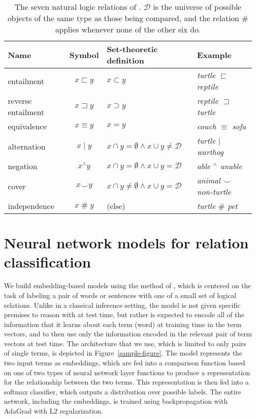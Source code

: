 \documentclass[letterpaper]{article}
\newcommand{\nateq}{\equiv}
\newcommand{\natind}{\mathbin{\#}}
\newcommand{\natneg}{\mathbin{^{\wedge}}}
\newcommand{\natfor}{\sqsubset}
\newcommand{\natrev}{\sqsupset}
\newcommand{\natalt}{\mathbin{|}}
\newcommand{\natcov}{\mathbin{\smallsmile}}
\def\ii#1{\textit{#1}}
\begin{document}
\begin{table*}[tp]
  \centering\small
  \setlength{\tabcolsep}{15pt}
  \renewcommand{\arraystretch}{1.1}
  \begin{tabular}{l c l l} 
    \toprule
    Name & Symbol & Set-theoretic definition & Example \\ 
    \midrule
    entailment         & $x \natfor y$   & $x \subset y$ & \ii{turtle $\natfor$ reptile}  \\ 
    reverse entailment & $x \natrev y$   & $x \supset y$ & \ii{reptile $\natrev$ turtle}  \\ 
    equivalence        & $x \nateq y$    & $x = y$       & \ii{couch $\nateq$ sofa} \\ 
    alternation        & $x \natalt y$   & $x \cap y = \emptyset \wedge x \cup y \neq \mathcal{D}$ & \ii{turtle $\natalt$ warthog} \\ 
    negation           & $x \natneg y$   & $x \cap y = \emptyset \wedge x \cup y = \mathcal{D}$    & \ii{able $\natneg$ unable} \\
    cover              & $x \natcov y$   & $x \cap y \neq \emptyset \wedge x \cup y = \mathcal{D}$ & \ii{animal $\natcov$ non-turtle} \\ 
    independence       & $x \natind y$   & (else) & \ii{turtle $\natind$ pet}\\
    \bottomrule
  \end{tabular}
  \protect\caption{\protect\label{b-table}The seven natural logic relations of \protect\cite{maccartney2009extended}. 
    $\mathcal{D}$ is the universe of possible objects of the same type as those being compared, 
    and the relation $\natind$ applies whenever none of the other six do.} 
\end{table*}

\section{Neural network models for relation classification} \label{methods}

We build embedding-based models using the method of
\cite{Bowman:Potts:Manning:2014}, which is centered on the task of
labeling a pair of words or sentences with one of a small set of
logical relations. Unlike in a classical inference
setting, the model is not given specific premises to reason with at test time, but rather
is expected to encode all of the information that it learns about each term (word) at training
time in the term vectors, and to then use only the information encoded in the relevant pair of
term vectors at test time. 
The architecture that we use, which is limited to
only pairs of single terms, is depicted in
Figure~\ref{sample-figure}. The model represents the two input terms
as embeddings, which are fed into a comparison function based on one
of two types of neural network layer functions to produce a
representation for the relationship between the two terms. This
representation is then fed into a softmax classifier, which outputs a
distribution over possible labels. The entire network, including the
embeddings, is trained using backpropagation with AdaGrad \cite{duchi2011adaptive}
with L2 regularization.
\end{document}
